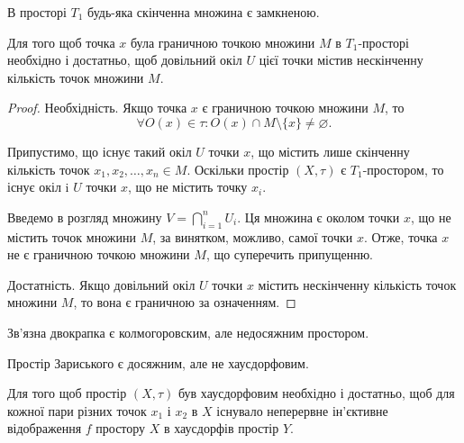 \documentclass[a4paper, 12pt]{article}
\renewcommand{\emptyset}{\varnothing}
\begin{document}
\begin{corollary}
	В просторі $T_1$ будь-яка скінченна множина є
	замкненою.
\end{corollary}

\begin{theorem}
	Для того щоб точка $x$ була граничною
	точкою множини $M$ в $T_1$-просторі необхідно і достатньо,
	щоб довільний окіл $U$ цієї точки містив нескінченну
	кількість точок множини $M$.
\end{theorem}

\begin{proof}
	Необхідність. Якщо точка $x$ є граничною
	точкою множини $M$, то \[ \forall O(x) \in \tau: O(x) \cap M \setminus \{x\} \ne \emptyset. \]

	Припустимо, що існує такий окіл $U$ точки $x$, що містить
	лише скінченну кількість точок $x_1, x_2, \ldots, x_n \in M$. Оскільки
	простір $(X, \tau)$ є $T_1$-простором, то існує окіл i $U$ точки $x$, що
	не містить точку $x_i$. \smallskip

	Введемо в розгляд множину $V = \bigcap_{i = 1}^n U_i$.
	Ця множина є околом точки $x$, що не містить точок
	множини $M$, за винятком, можливо, самої точки $x$. Отже,
	точка $x$ не є граничною точкою множини $M$, що
	суперечить припущенню. \smallskip

	Достатність. Якщо довільний окіл $U$ точки $x$ містить
	нескінченну кількість точок множини $M$, то вона є
	граничною за означенням.
\end{proof}

\begin{example}
	Зв'язна двокрапка є колмогоровским, але
	недосяжним простором.
\end{example}

\begin{example}
	Простір Зариського є досяжним, але не
	хаусдорфовим.
\end{example}

\begin{theorem}
	Для того щоб
	простір $(X, \tau)$ був хаусдорфовим необхідно і достатньо,
	щоб для кожної пари різних точок $x_1$ і $x_2$ в $X$ існувало
	неперервне ін'єктивне відображення $f$ простору $X$ в
	хаусдорфів простір $Y$.
\end{theorem}
\end{document}
